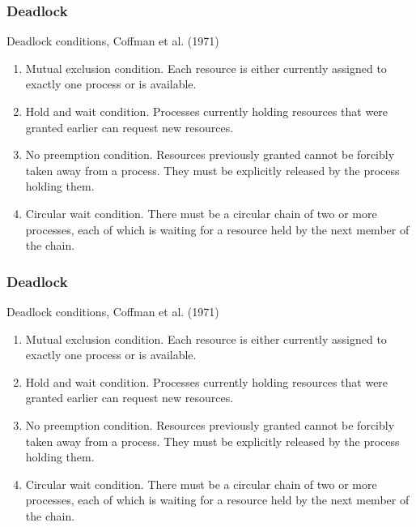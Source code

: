 \begin{frame}
  \frametitle{Deadlock}
  \begin{block}{Deadlock conditions, Coffman et al. (1971)}
    \begin{enumerate}
      \item Mutual exclusion condition. Each resource is either currently assigned to exactly one process or is available.
      \item Hold and wait condition. Processes currently holding resources that were granted earlier can request new resources.
      \item No preemption condition. Resources previously granted cannot be forcibly taken away from a process. They must be explicitly released by the process holding them.
      \item Circular wait condition. There must be a circular chain of two or more processes, each of which is waiting for a resource held by the next member of the chain.
    \end{enumerate}
  \end{block}
\end{frame}

\begin{frame}
  \frametitle{Deadlock}
  \begin{block}{Deadlock conditions, Coffman et al. (1971)}
    \begin{enumerate}
      \item Mutual exclusion condition. Each resource is either currently assigned to exactly one process or is available.
      \item Hold and wait condition. Processes currently holding resources that were granted earlier can request new resources.
      \item No preemption condition. Resources previously granted cannot be forcibly taken away from a process. They must be explicitly released by the process holding them.
      \item Circular wait condition. There must be a circular chain of two or more processes, each of which is waiting for a resource held by the next member of the chain.
    \end{enumerate}
  \end{block}
\end{frame}

